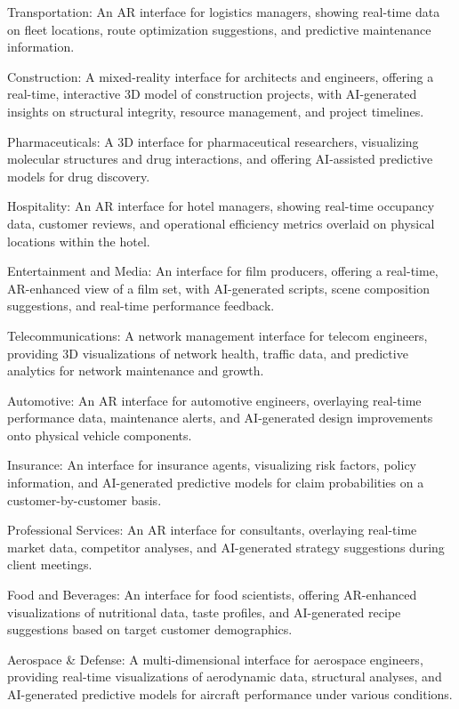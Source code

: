 \documentclass[11pt]{article}
\begin{document}
Transportation: An AR interface for logistics managers, showing real-time data on fleet locations, route optimization suggestions, and predictive maintenance information.


Construction: A mixed-reality interface for architects and engineers, offering a real-time, interactive 3D model of construction projects, with AI-generated insights on structural integrity, resource management, and project timelines.


Pharmaceuticals: A 3D interface for pharmaceutical researchers, visualizing molecular structures and drug interactions, and offering AI-assisted predictive models for drug discovery.


Hospitality: An AR interface for hotel managers, showing real-time occupancy data, customer reviews, and operational efficiency metrics overlaid on physical locations within the hotel.


Entertainment and Media: An interface for film producers, offering a real-time, AR-enhanced view of a film set, with AI-generated scripts, scene composition suggestions, and real-time performance feedback.


Telecommunications: A network management interface for telecom engineers, providing 3D visualizations of network health, traffic data, and predictive analytics for network maintenance and growth.


Automotive: An AR interface for automotive engineers, overlaying real-time performance data, maintenance alerts, and AI-generated design improvements onto physical vehicle components.


Insurance: An interface for insurance agents, visualizing risk factors, policy information, and AI-generated predictive models for claim probabilities on a customer-by-customer basis.


Professional Services: An AR interface for consultants, overlaying real-time market data, competitor analyses, and AI-generated strategy suggestions during client meetings.


Food and Beverages: An interface for food scientists, offering AR-enhanced visualizations of nutritional data, taste profiles, and AI-generated recipe suggestions based on target customer demographics.


Aerospace \& Defense: A multi-dimensional interface for aerospace engineers, providing real-time visualizations of aerodynamic data, structural analyses, and AI-generated predictive models for aircraft performance under various conditions.
\end{document}
